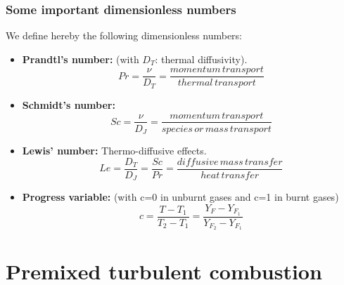 \documentclass[a4paper,11pt]{article}
\begin{document}
\subsubsection{Some important dimensionless numbers}
We define hereby the following dimensionless numbers:
\begin{itemize}
	\item \textbf{Prandtl's number:} (with $D_T$: thermal diffusivity).
	\[Pr = \frac{\nu}{D_T}=\frac{momentum \, transport}{thermal \, transport}\]
	\item \textbf{Schmidt's number:} 
	\[Sc=\frac{\nu}{D_J}=\frac{momentum \, transport}{species \, or \, mass \, transport}\]
	\item \textbf{Lewis' number:} Thermo-diffusive effects.
	\[Le=\frac{D_T}{D_J} = \frac{Sc}{Pr} = \frac{diffusive \, mass \, transfer}{heat \, transfer}\]
	\item \textbf{Progress variable:} (with c=0 in unburnt gases and c=1 in burnt gases)
	\[c = \frac{T-T_1}{T_2 - T_1} = \frac{Y_F - Y_{F_1}}{Y_{F_2}-Y_{F_1}}\]
\end{itemize}
\pagebreak
\section{Premixed turbulent combustion}
\end{document}
